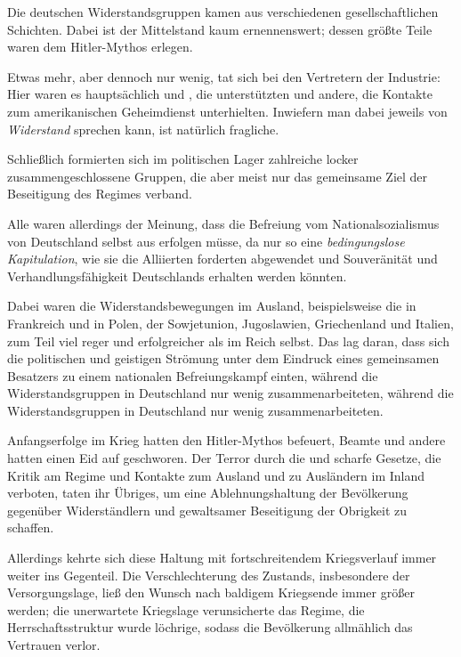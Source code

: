 Die deutschen Widerstandsgruppen kamen aus verschiedenen
gesellschaftlichen Schichten. Dabei ist der Mittelstand kaum
ernennenswert; dessen größte Teile waren dem 
Hitler-Mythos erlegen.

Etwas mehr, aber dennoch nur wenig, tat sich bei den Vertretern der
Industrie: Hier waren es hauptsächlich  und
, die  unterstützten und andere, die Kontakte zum
amerikanischen Geheimdienst unterhielten. Inwiefern man dabei jeweils
von \emph{Widerstand} sprechen kann, ist natürlich fragliche.

Schließlich formierten sich im politischen Lager zahlreiche locker
zusammengeschlossene Gruppen, die aber meist nur das gemeinsame Ziel
der Beseitigung des Regimes verband.

Alle waren allerdings der Meinung, dass die Befreiung vom
Nationalsozialismus von Deutschland selbst aus erfolgen müsse, da nur
so eine \emph{bedingungslose Kapitulation}, wie sie die Alliierten
forderten abgewendet und Souveränität und Verhandlungsfähigkeit
Deutschlands erhalten werden könnten.

Dabei waren die Widerstandsbewegungen im Ausland, beispielsweise die
 in Frankreich und 
 in Polen, der Sowjetunion, Jugoslawien,
Griechenland und Italien, zum Teil viel reger und erfolgreicher als im
Reich selbst. Das lag daran, dass sich die politischen und geistigen
Strömung unter dem Eindruck eines gemeinsamen Besatzers zu einem
nationalen Befreiungskampf einten, während die Widerstandsgruppen in
Deutschland nur wenig zusammenarbeiteten, während die
Widerstandsgruppen in Deutschland nur wenig zusammenarbeiteten.

Anfangserfolge im Krieg hatten den  Hitler-Mythos
befeuert, Beamte und andere hatten einen Eid auf  geschworen. Der Terror durch die  und
scharfe Gesetze, die Kritik am Regime und Kontakte zum Ausland und zu
Ausländern im Inland verboten, taten ihr Übriges, um eine
Ablehnungshaltung der Bevölkerung gegenüber Widerständlern und
gewaltsamer Beseitigung der Obrigkeit zu schaffen.

Allerdings kehrte sich diese Haltung mit fortschreitendem
Kriegsverlauf immer weiter ins Gegenteil. Die Verschlechterung des
Zustands, insbesondere der Versorgungslage, ließ den Wunsch nach
baldigem Kriegsende immer größer werden; die unerwartete Kriegslage
verunsicherte das Regime, die Herrschaftsstruktur wurde löchrige,
sodass die Bevölkerung allmählich das Vertrauen verlor.

